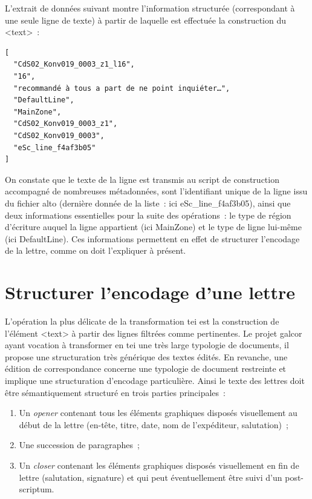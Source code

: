 \documentclass[a4paper,12pt,twoside]{book}
\begin{document}
			L'extrait de données suivant montre l'information structurée (correspondant à une seule ligne de texte) à partir de laquelle est effectuée la construction du \textsf{<text>}~:
			
			\begin{verbatim}
[
  "CdS02_Konv019_0003_z1_l16",
  "16", 
  "recommandé à tous a part de ne point inquiéter…", 
  "DefaultLine", 
  "MainZone", 
  "CdS02_Konv019_0003_z1", 
  "CdS02_Konv019_0003", 
  "eSc_line_f4af3b05"
]
			\end{verbatim}
			
			On constate que le texte de la ligne est transmis au script de construction accompagné de nombreuses métadonnées, sont l'identifiant unique de la ligne issu du fichier \gls{alto} (dernière donnée de la liste~: ici \textsf{eSc\_line\_f4af3b05}), ainsi que deux informations essentielles pour la suite des opérations~: le type de région d'écriture auquel la ligne appartient (ici \textsf{MainZone}) et le type de ligne lui-même (ici \textsf{DefaultLine}). Ces informations permettent en effet de structurer l'encodage de la lettre, comme on doit l'expliquer à présent.
						
		\section{Structurer l'encodage d'une lettre}

			L'opération la plus délicate de la transformation \gls{tei} est la construction de l'élément \textsf{<text>} à partir des lignes filtrées comme pertinentes. Le projet \gls{galcor} ayant vocation à transformer en \gls{tei} une très large typologie de documents, il propose une structuration très générique des textes édités. En revanche, une édition de correspondance concerne une typologie de document restreinte et implique une structuration d'encodage particulière. Ainsi le texte des lettres doit être sémantiquement structuré en trois parties principales~:
			
			\begin{enumerate}
				\item Un \textit{opener} contenant tous les éléments graphiques disposés visuellement au début de la lettre (en-tête, titre, date, nom de l'expéditeur, salutation)~;
				\item Une succession de paragraphes~;
				\item Un \textit{closer} contenant les éléments graphiques disposés visuellement en fin de lettre (salutation, signature) et qui peut éventuellement être suivi d'un post-scriptum.
			\end{enumerate}
		
\end{document}
